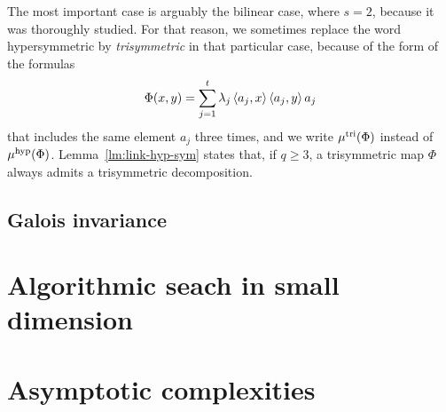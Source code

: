 The most important case is arguably the bilinear case, where $s=2$, because it
was thoroughly studied. For that reason, we sometimes replace the word
hypersymmetric by \emph{trisymmetric} in that particular case, because of the
form of the formulas
\[
  \Phi(x, y) = \sum_{j=1}^t\lambda_j\left\langle a_j,x\right\rangle\left\langle a_j,y\right\rangle a_j
\]
that includes the same element $a_j$ three times, and we write $\mu^{\textrm{tri}}(\Phi)$
instead of $\mu^{\textrm{hyp}}(\Phi)$. Lemma~\ref{lm:link-hyp-sym} states that, if $q\geq3$, a
trisymmetric map $\Phi$ always admits a trisymmetric decomposition.

\subsection{Galois invariance}

\section{Algorithmic seach in small dimension}
\section{Asymptotic complexities}
